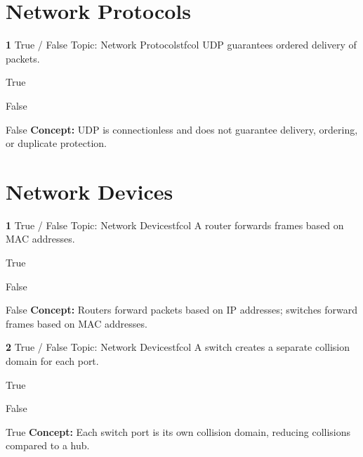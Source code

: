 \documentclass[10pt,a4paper]{article}
\begin{document}
\section{Network Protocols}
\begin{qcard}{\color{white}\textbf{1} \hfill \small True / False \textbar{} Topic: Network Protocols}{tfcol}
UDP guarantees ordered delivery of packets.

\begin{qoptions}
\item True
\item False
\end{qoptions}
\begin{explainbox}{False}
\textbf{Concept:} UDP is connectionless and does not guarantee delivery, ordering, or duplicate protection.
\end{explainbox}
\end{qcard}

\section{Network Devices}
\begin{qcard}{\color{white}\textbf{1} \hfill \small True / False \textbar{} Topic: Network Devices}{tfcol}
A router forwards frames based on MAC addresses.

\begin{qoptions}
\item True
\item False
\end{qoptions}
\begin{explainbox}{False}
\textbf{Concept:} Routers forward packets based on IP addresses; switches forward frames based on MAC addresses.
\end{explainbox}
\end{qcard}

\begin{qcard}{\color{white}\textbf{2} \hfill \small True / False \textbar{} Topic: Network Devices}{tfcol}
A switch creates a separate collision domain for each port.

\begin{qoptions}
\item True
\item False
\end{qoptions}
\begin{explainbox}{True}
\textbf{Concept:} Each switch port is its own collision domain, reducing collisions compared to a hub.
\end{explainbox}
\end{qcard}
\end{document}
